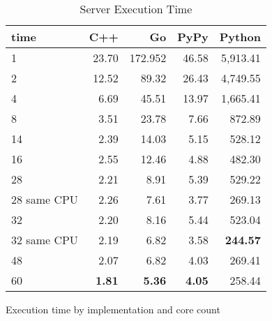 \begin{table}[ht]
    \centering
    \begin{tabular}{lrrrr}
        \hline
        time         & C++             & Go            & PyPy          & Python     \\
        \hline
        1            & 23.70           & 172.952       & 46.58         & 5,913.41        \\
        2            & 12.52           & 89.32         & 26.43         & 4,749.55        \\
        4            & 6.69            & 45.51         & 13.97         & 1,665.41        \\
        8	           & 3.51  	         & 23.78 	       & 7.66          & 872.89          \\
        14           & 2.39            & 14.03         & 5.15          & 528.12          \\
        16           & 2.55            & 12.46         & 4.88          & 482.30          \\
        28           & 2.21            & 8.91          & 5.39          & 529.22          \\
        28 same CPU  & 2.26            & 7.61          & 3.77          & 269.13          \\
        32           & 2.20            & 8.16          & 5.44          & 523.04          \\
        32 same CPU  & 2.19            & 6.82          & 3.58          & \textbf{244.57} \\
        48           & 2.07            & 6.82          & 4.03          & 269.41          \\
        60           & \textbf{1.81}   & \textbf{5.36} & \textbf{4.05} & 258.44          \\
        \hline
    \end{tabular}
    \caption{Server Execution Time}{Execution time by implementation and core count}
    \label{tab:server-execution-time}
\end{table}
